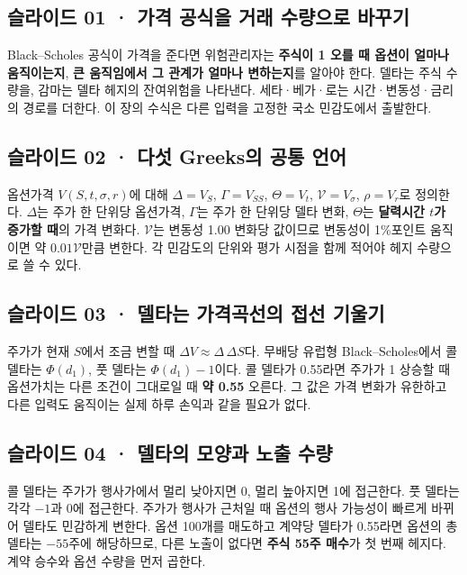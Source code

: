 \documentclass[11pt,a4paper]{article}
\begin{document}
\subsection{슬라이드 01 · 가격 공식을 거래 수량으로 바꾸기}
Black–Scholes 공식이 가격을 준다면 위험관리자는 \textbf{주식이 1 오를 때 옵션이 얼마나 움직이는지}, \textbf{큰 움직임에서 그 관계가 얼마나 변하는지}를 알아야 한다. 델타는 주식 수량을, 감마는 델타 헤지의 잔여위험을 나타낸다. 세타·베가·로는 시간·변동성·금리의 경로를 더한다. 이 장의 수식은 다른 입력을 고정한 국소 민감도에서 출발한다.\par

\subsection{슬라이드 02 · 다섯 Greeks의 공통 언어}
옵션가격 $V(S,t,\sigma,r)$에 대해 $\Delta=V_S$, $\Gamma=V_{SS}$, $\Theta=V_t$, $\mathcal V=V_\sigma$, $\rho=V_r$로 정의한다. $\Delta$는 주가 한 단위당 옵션가격, $\Gamma$는 주가 한 단위당 델타 변화, $\Theta$는 \textbf{달력시간 $t$가 증가할 때}의 가격 변화다. $\mathcal V$는 변동성 1.00 변화당 값이므로 변동성이 1\%포인트 움직이면 약 $0.01\mathcal V$만큼 변한다. 각 민감도의 단위와 평가 시점을 함께 적어야 헤지 수량으로 쓸 수 있다.\par

\subsection{슬라이드 03 · 델타는 가격곡선의 접선 기울기}
주가가 현재 $S$에서 조금 변할 때 $\Delta V\approx\Delta\,\Delta S$다. 무배당 유럽형 Black–Scholes에서 콜 델타는 $\Phi(d_1)$, 풋 델타는 $\Phi(d_1)-1$이다. 콜 델타가 0.55라면 주가가 1 상승할 때 옵션가치는 다른 조건이 그대로일 때 \textbf{약 0.55} 오른다. 그 값은 가격 변화가 유한하고 다른 입력도 움직이는 실제 하루 손익과 같을 필요가 없다.\par

\subsection{슬라이드 04 · 델타의 모양과 노출 수량}
콜 델타는 주가가 행사가에서 멀리 낮아지면 0, 멀리 높아지면 1에 접근한다. 풋 델타는 각각 $-1$과 0에 접근한다. 주가가 행사가 근처일 때 옵션의 행사 가능성이 빠르게 바뀌어 델타도 민감하게 변한다. 옵션 100개를 매도하고 계약당 델타가 0.55라면 옵션의 총 델타는 $-55$주에 해당하므로, 다른 노출이 없다면 \textbf{주식 55주 매수}가 첫 번째 헤지다. 계약 승수와 옵션 수량을 먼저 곱한다.\par
\end{document}
